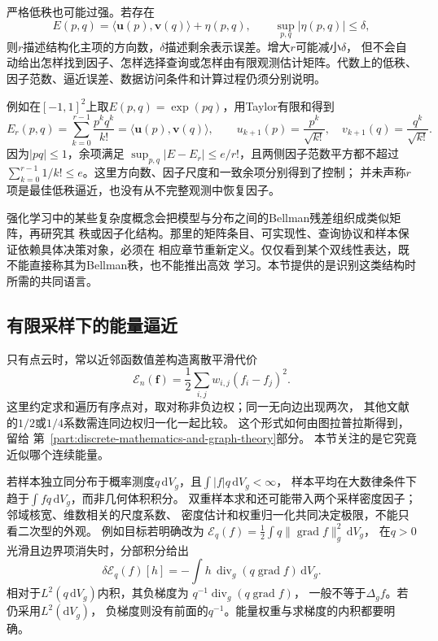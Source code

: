 严格低秩也可能过强。若存在
\[
  E(p,q)
  =
  \langle\bm{u}(p),\bm{v}(q)\rangle+\eta(p,q),
  \qquad
  \sup_{p,q}|\eta(p,q)|\leq\delta,
\]
则$r$描述结构化主项的方向数，$\delta$描述剩余表示误差。增大$r$可能减小$\delta$，
但不会自动给出怎样找到因子、怎样选择查询或怎样由有限观测估计矩阵。代数上的低秩、
因子范数、逼近误差、数据访问条件和计算过程仍须分别说明。

例如在$[-1,1]^2$上取$E(p,q)=\exp(pq)$，用Taylor有限和得到
\[
 E_r(p,q)=\sum_{k=0}^{r-1}\frac{p^kq^k}{k!}
 =\langle\bm u(p),\bm v(q)\rangle,\qquad
 u_{k+1}(p)=\frac{p^k}{\sqrt{k!}},\quad
 v_{k+1}(q)=\frac{q^k}{\sqrt{k!}}.
\]
因为$|pq|\leq1$，余项满足
$\sup_{p,q}|E-E_r|\leq e/r!$，且两侧因子范数平方都不超过
$\sum_{k=0}^{r-1}1/k!\leq e$。这里方向数、因子尺度和一致余项分别得到了控制；
并未声称$r$项是最佳低秩逼近，也没有从不完整观测中恢复因子。

强化学习中的某些复杂度概念会把模型与分布之间的Bellman残差组织成类似矩阵，再研究其
秩或因子化结构。那里的矩阵条目、可实现性、查询协议和样本保证依赖具体决策对象，必须在
相应章节重新定义。仅仅看到某个双线性表达，既不能直接称其为Bellman秩，也不能推出高效
学习。本节提供的是识别这类结构时所需的共同语言。

\subsection{有限采样下的能量逼近}
\label{sec:functional-sampled-energy-approximation}
\label{sec:geometry-sampled-geometric-operators}

只有点云时，常以近邻函数值差构造离散平滑代价
\[
 \mathcal E_n(\bm f)=\frac12\sum_{i,j}w_{i,j}(f_i-f_j)^2.
\]
这里约定求和遍历有序点对，取对称非负边权；同一无向边出现两次，
其他文献的$1/2$或$1/4$系数需连同边权归一化一起比较。
这个形式如何由图拉普拉斯得到，留给
第~\ref{part:discrete-mathematics-and-graph-theory}部分。
本节关注的是它究竟近似哪个连续能量。

若样本独立同分布于概率测度$q\,\mathrm dV_g$，且$\int|f|q\,\mathrm dV_g<\infty$，
样本平均在大数律条件下趋于$\int f q\,\mathrm dV_g$，而非几何体积积分。
双重样本求和还可能带入两个采样密度因子；邻域核宽、维数相关的尺度系数、
密度估计和权重归一化共同决定极限，不能只看二次型的外观。
例如目标若明确改为
$\mathcal E_q(f)=\frac12\int q\lVert\operatorname{grad}f\rVert_g^2\,\mathrm dV_g$，
在$q>0$光滑且边界项消失时，分部积分给出
\[
 \delta\mathcal E_q(f)[h]
 =-\int h\,\operatorname{div}_g(q\operatorname{grad}f)\,\mathrm dV_g.
\]
相对于$L^2(q\,\mathrm dV_g)$内积，其负梯度为
$q^{-1}\operatorname{div}_g(q\operatorname{grad}f)$，
一般不等于$\Delta_gf$。若仍采用$L^2(\mathrm dV_g)$，
负梯度则没有前面的$q^{-1}$。能量权重与求梯度的内积都要明确。

